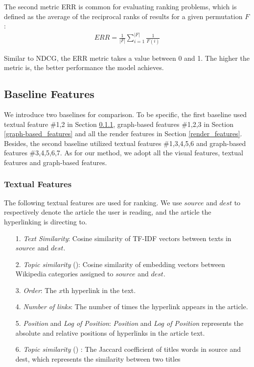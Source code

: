 The second metric ERR is common for evaluating ranking problems, which is defined as the average of the reciprocal ranks of results for a given permutation $F$:
\begin{align*}
    ERR = \frac{1}{|F|} \sum_{i=1}^{|F|} \frac{1}{F(i)}
\end{align*}

Similar to NDCG, the ERR metric takes a value between 0 and 1. The higher the metric is, the better performance the model achieves.
\subsection{Baseline Features}

We introduce two baselines \cite{thruesen2016link, dimitrov2017makes} for comparison. To be specific, the first baseline \cite{dimitrov2017makes} used textual feature \#1,2 in Section \ref{textual_features}, graph-based features \#1,2,3 in Section \ref{graph-based_features} and all the render features in Section \ref{render_features}. Besides, the second baseline \cite{thruesen2016link} utilized textual features \#1,3,4,5,6 and graph-based features \#3,4,5,6,7. As for our method, we adopt all the visual features, textual features and graph-based features.

\subsubsection{Textual Features} \label{textual_features}

The following textual features are used for ranking. We use $source$ and $dest$ to respectively denote the article the user is reading, and the article the hyperlinking is directing to.

\begin{itemize}

    \item[1.] \emph{Text Similarity}: Cosine similarity of TF-IDF vectors between texts in $source$ and $dest$.

    \item[2.] \emph{Topic similarity} (\cite{dimitrov2017makes}): Cosine similarity of embedding vectors between Wikipedia categories assigned to $source$ and $dest$.

    \item[3.] \emph{Order}: The $x$th hyperlink in the text.

    \item[4.] \emph{Number of links}: The number of times the hyperlink appears in the article. 

    \item[5.] \emph{Position} and \emph{Log of Position}: \emph{Position} and \emph{Log of Position} represents the absolute and relative positions of hyperlinks in the article text.

    \item[6.] \emph{Topic similarity} (\cite{thruesen2016link}) : The Jaccard coefficient of titles words in
    source and dest, which represents the similarity between two titles

\end{itemize}

